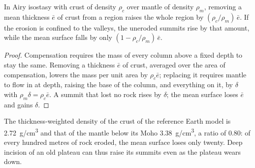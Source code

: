\begin{proposition}\label{prop:b3:quantitative-geomorphology:rebound}
In Airy isostasy with crust of density $\rho_c$ over mantle of density
$\rho_m$, removing a mean thickness $\bar e$ of crust from a region raises
the whole region by $(\rho_c/\rho_m)\,\bar e$. If the erosion is confined
to the valleys, the uneroded summits rise by that amount, while the mean
surface falls by only $(1 - \rho_c/\rho_m)\,\bar e$.
\end{proposition}

\begin{proof}
Compensation requires the mass of every column above a fixed depth to stay
the same. Removing a thickness $\bar e$ of crust, averaged over the area
of compensation, lowers the mass per unit area by $\rho_c \bar e$;
replacing it requires mantle to flow in at depth, raising the base of the
column, and everything on it, by $\delta$ with $\rho_m \delta = \rho_c \bar
e$. A summit that lost no rock rises by $\delta$; the mean surface loses
$\bar e$ and gains $\delta$.
\end{proof}

The thickness-weighted density of the crust of the reference Earth model is
\qty{2.72}{g/cm^3} and that of the mantle below its Moho \qty{3.38}{g/cm^3},
a ratio of 0.80: of every hundred metres of rock eroded, the mean surface
loses only twenty. Deep incision of an old plateau can thus raise its
summits even as the plateau wears down.

